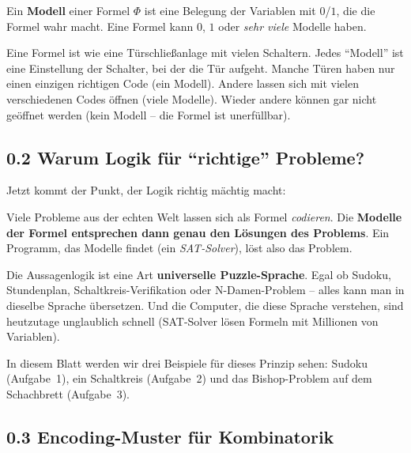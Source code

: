 \documentclass[a4paper,12pt]{article}
\begin{document}
\begin{merkbox}
Ein \textbf{Modell} einer Formel $\Phi$ ist eine Belegung der
Variablen mit $0$/$1$, die die Formel wahr macht.
Eine Formel kann $0$, $1$ oder \emph{sehr viele} Modelle haben.
\end{merkbox}

\begin{analogie}
Eine Formel ist wie eine T\"urschlie{\ss}anlage mit vielen Schaltern.
Jedes "`Modell"' ist eine Einstellung der Schalter, bei der die T\"ur
aufgeht. Manche T\"uren haben nur einen einzigen richtigen Code
(ein Modell). Andere lassen sich mit vielen verschiedenen Codes
\"offnen (viele Modelle). Wieder andere k\"onnen gar nicht ge\"offnet
werden (kein Modell -- die Formel ist unerf\"ullbar).
\end{analogie}

\subsection*{0.2 Warum Logik f\"ur "`richtige"' Probleme?}

Jetzt kommt der Punkt, der Logik richtig m\"achtig macht:

\begin{merkbox}[title={Die gro{\ss}e Idee}]
Viele Probleme aus der echten Welt lassen sich als Formel
\emph{codieren}. Die \textbf{Modelle der Formel entsprechen dann
genau den L\"osungen des Problems}. Ein Programm, das Modelle findet
(ein \emph{SAT-Solver}), l\"ost also das Problem.
\end{merkbox}

\begin{analogie}
Die Aussagenlogik ist eine Art \textbf{universelle Puzzle-Sprache}.
Egal ob Sudoku, Stundenplan, Schaltkreis-Verifikation oder
N-Damen-Problem -- alles kann man in dieselbe Sprache \"ubersetzen.
Und die Computer, die diese Sprache verstehen, sind heutzutage
unglaublich schnell (SAT-Solver l\"osen Formeln mit Millionen von
Variablen).
\end{analogie}

In diesem Blatt werden wir drei Beispiele f\"ur dieses Prinzip sehen:
Sudoku (Aufgabe~1), ein Schaltkreis (Aufgabe~2) und das
Bishop-Problem auf dem Schachbrett (Aufgabe~3).

\subsection*{0.3 Encoding-Muster f\"ur Kombinatorik}
\end{document}
